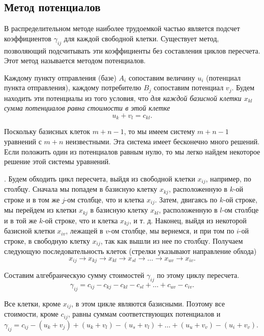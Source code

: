 \subsection{Метод потенциалов}

В распределительном методе наиболее трудоемкой частью является подсчет коэффициентов $\gamma_{ij}$ для каждой свободной клетки. Существует метод, позволяющий подсчитывать эти коэффициенты без составления циклов пересчета. Этот метод называется методом потенциалов.

Каждому  пункту отправления (базе) $A_i$ сопоставим величину $u_i$ (потенциал пункта отправления), каждому потребителю $B_j$ сопоставим потенциал $v_j$. Будем находить эти потенциалы из того условия, что {\it для каждой базисной клетки $x_{kl}$ сумма потенциалов равна стоимости в этой клетке}
$$u_k + v_l = c_{kl}.$$

Поскольку базисных клеток $m + n - 1$, то мы имеем систему $m + n - 1$  уравнений с $m + n$ неизвестными. Эта система имеет бесконечно много решений. Если положить один из потенциалов равным нулю, то мы легко найдем некоторое решение этой системы уравнений.


. Будем обходить цикл пересчета, выйдя из свободной клетки $x_{ij}$, например, по столбцу. Сначала мы попадем в базисную клетку $x_{kj}$, расположенную в $k$-ой строке и в том же $j$-ом столбце, что и клетка $x_{ij}$. Затем, двигаясь по $k$-ой строке, мы перейдем из клетки $x_{kj}$ в базисную клетку $x_{kl}$, расположенную в $l$-ом столбце и в той же $k$-ой строке, что и клетка $x_{kj}$, и т. д. Наконец, выйдя из некоторой базисной клетки $x_{iv}$, лежащей в $v$-ом столбце, мы вернемся, и при том по $i$-ой строке, в свободную клетку $x_{ij}$, так как вышли из нее по столбцу. Получаем следующую последовательность клеток (стрелки указывают направление обхода)
$$x_{ij} \to x_{kj} \to x_{kl} \to x_{sl} \to \ldots \to x_{uv} \to x_{iv}.$$

Составим алгебраическую сумму стоимостей $\gamma_{ij}$ по этому циклу пересчета.
$$\gamma_{ij} = c_{ij} - c_{kj} - c_{kl} - c_{sl} + \ldots + c_{uv} - c_{iv}.$$

Все клетки, кроме $x_{ij}$, в этом цикле являются базисными. Поэтому все стоимости, кроме $c_{ij}$, равны суммам соответствующих потенциалов и $\gamma_{ij} = c_{ij} - (u_k + v_j) + (u_k + v_l) - (u_s + v_l) + \ldots + (u_u + v_v) - (u_i + v_v)$.

